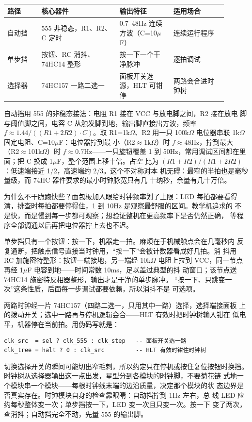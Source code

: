 \begin{longtable}{L{0.14\linewidth}L{0.32\linewidth}L{0.22\linewidth}L{0.22\linewidth}}
\toprule
路径 & 核心器件 & 输出特征 & 适用场合 \\
\midrule
自动挡 & 555 非稳态，R1、R2、C 定时 & 0.7--48Hz 连续方波（C=10$\mu$F） & 连续运行程序 \\
单步挡 & 按钮、RC 消抖、74HC14 整形 & 按一下一个干净脉冲 & 逐拍调试 \\
选择器 & 74HC157 一路二选一 & 面板开关选源，HLT 可钳停 & 两路会合进时钟树 \\
\bottomrule
\end{longtable}

自动挡用 555 的非稳态接法：电阻 R1 接在 VCC 与放电脚之间，R2 接在放电
脚与阈值脚之间，电容 C 从触发脚到地，输出脚直接出方波，频率
$f \approx 1.44/((R1+2R2)\cdot C)$。取 R1=1k$\Omega$、R2 用一只
100k$\Omega$ 电位器串联 1k$\Omega$ 固定电阻、C=10$\mu$F：电位器拧到最
小（R2$\approx$1k$\Omega$）时 $f \approx 48$Hz，拧到最大
（R2$\approx$101k$\Omega$）时 $f \approx 0.7$Hz——一只旋钮覆盖 1 到
50Hz，常用调试区间都在里面；把 C 换成 1$\mu$F，整个范围上移十倍。占空
比为 $(R1+R2)/(R1+2R2)$：低速端接近 1/2，高速端约 2/3。这个不对称对本
机无碍：最窄的半拍也是毫秒量级，而 74HC 器件要求的最小时钟脉宽只有几
十纳秒，余量有几十万倍。

为什么不干脆跑快些？面包板加人眼给时钟频率划了上限：LED 每拍都要看得
清，排查时每拍都要停得住，1 到 10Hz 是观察最舒服的区间。教学机追求的
不是快，而是慢到每一步都可观察；想验证整机在更高频率下是否仍然正确，
等程序全部调通以后再把电位器拧上去也不迟。

单步挡只有一个按钮：按一下，机器走一拍。麻烦在于机械触点会在几毫秒内
反复通断，把触点信号直接当时钟用，“按一下”会被计数器看成好几拍。消
抖用 RC 加施密特整形：按钮一端接地，另一端经 10k$\Omega$ 电阻上拉到
VCC，同一节点再经 1$\mu$F 电容到地——时间常数 10ms，足以盖过典型的抖
动窗口；该节点送 74HC14 施密特反相器整形，输出才是干净的单步脉冲。
“按一下、只跳变一次”这条性质，后面每一步调试都要依赖，所以消抖不是
可选项。

两路时钟经一片 74HC157（四路二选一，只用其中一路）选择，选择端接面板
上的拨动开关；选中一路再与停机逻辑会合——HLT 有效时把时钟树输入钳在
低电平，机器停在当前拍。用伪码写就是：

\begin{lstlisting}
clk_src  = sel ? clk_555 : clk_step   -- 面板开关选一路
clk_tree = halt ? 0 : clk_src         -- HLT 有效时钳住时钟树
\end{lstlisting}

切换选择开关的瞬间可能切出窄毛刺，所以约定只在停机或按住复位按钮时换挡。时钟树从选择器输出这一点出发，星型分到各模块的时钟脚，不要菊花链
式地一个模块串一个模块——每根时钟线末端的边沿质量，决定那个模块的状
态边界是否真实存在。时钟模块自身的检查靠眼睛：自动挡拧到 1Hz 左右，总
线 LED 应约每秒整体变一次；单步挡按一下，LED 变一次且只变一次。按一下
变了两次，查消抖；自动挡完全不动，先量 555 的输出脚。

